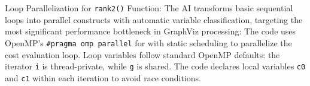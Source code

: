Loop Parallelization for \texttt{rank2()} Function: 
The AI transforms basic sequential loops into parallel constructs with automatic variable classification, targeting the most significant performance bottleneck in GraphViz processing:
The code uses OpenMP's \texttt{\#pragma omp parallel} for with static scheduling to parallelize the cost evaluation loop. Loop variables follow standard OpenMP defaults: the iterator \texttt{i} is thread-private, while \texttt{g} is shared. The code declares local variables \texttt{c0} and \texttt{c1} within each iteration to avoid race conditions. %

